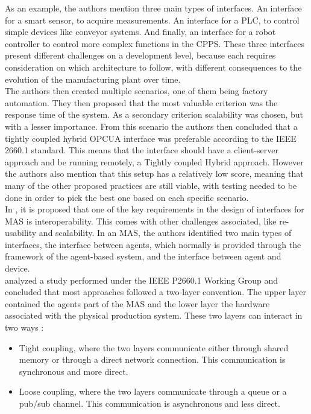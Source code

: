 As an example, the authors mention three main types of interfaces. An interface for a smart sensor, to acquire measurements. An interface for a \gls{PLC}, to control simple devices like conveyor systems. And finally, an interface for a robot controller to control more complex functions in the \gls{CPPS}. These three interfaces present different challenges on a development level, because each requires consideration on which architecture to follow, with different consequences to the evolution of the manufacturing plant over time.\\

The authors then created multiple scenarios, one of them being factory automation. They then proposed that the most valuable criterion was the response time of the system. As a secondary criterion scalability was chosen, but with a lesser importance. From this scenario the authors then concluded that a tightly coupled hybrid \gls{OPCUA} interface was preferable according to the IEEE 2660.1 standard. This means that the interface should have a client-server approach and be running remotely, a Tightly coupled Hybrid approach. However the authors also mention that this setup has a relatively low score, meaning that many of the other proposed practices are still viable, with testing needed to be done in order to pick the best one based on each specific scenario.\\


In \cite{Karnouskos2019}, it is proposed that one of the key requirements in the design of interfaces for \gls{MAS} is interoperability. This comes with other challenges associated, like re-usability and scalability. In an \gls{MAS}, the authors identified two main types of interfaces, the interface between agents, which normally is provided through the framework of the agent-based system, and the interface between agent and device. \\


\citeauthor{8591641} \cite{8591641} analyzed a study performed under the IEEE P2660.1 Working Group \cite{9340089} and concluded that most approaches followed a two-layer convention. The upper layer contained the agents part of the MAS and the lower layer the hardware associated with the physical production system. These two layers can interact in two ways \cite{8591641}:
\begin{itemize}
	\item Tight coupling, where the two layers communicate either through shared memory or through a direct network connection. This communication is synchronous and more direct.
	\item Loose coupling, where the two layers communicate through a queue or a pub/sub channel. This communication is asynchronous and less direct.
\end{itemize}

